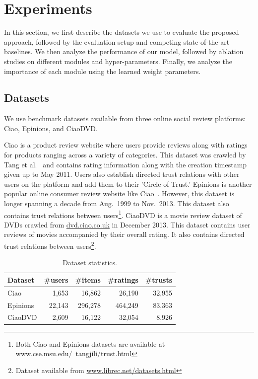 \section{Experiments}
In this section, we first describe the datasets we use to evaluate the proposed approach, followed by the evaluation setup and competing state-of-the-art baselines. We then analyze the performance of our model, followed by ablation studies on different modules and hyper-parameters. Finally, we analyze the importance of each module using the learned weight parameters.

\subsection{Datasets}
We use benchmark datasets available from three online social review platforms: Ciao, Epinions, and CiaoDVD.

Ciao is a product review website where users provide reviews along with ratings for products ranging across a variety of categories. This dataset was crawled by Tang et al.~\cite{Tang} and contains rating information along with the creation timestamp given up to May 2011. Users also establish directed trust relations with other users on the platform and add them to their 'Circle of Trust.'
Epinions is another popular online consumer review website like Ciao~\cite{Tang}. However, this dataset is longer spanning a decade from Aug.\ 1999 to Nov.\ 2013. This dataset also contains trust relations between users\footnote{Both Ciao and Epinions datasets are available at www.cse.msu.edu/~tangjili/trust.html}.
CiaoDVD is a movie review dataset of DVDs crawled from \url{dvd.ciao.co.uk} in December 2013. This dataset contains user reviews of movies accompanied by their overall rating. It also contains directed trust relations between users\footnote{Dataset available from \url{www.librec.net/datasets.html}}.

\begin{table}[tbh]
  \centering
\begin{tabular}{l r r r r } \toprule
  Dataset & \#users & \#items  & \#ratings & \#trusts\\ \hline
 Ciao & 1,653  & 16,862 & 26,190 & 32,955 \\
 Epinions&  22,143  & 296,278 & 464,249 & 83,363 \\
 CiaoDVD & 2,609  & 16,122 & 32,054 & 8,926 \\\bottomrule
\end{tabular}
\vspace{-0.1in}
  \caption{Dataset statistics.}
\label{tab:data}
\end{table}

